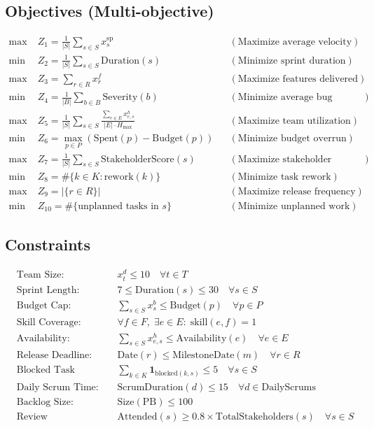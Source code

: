 \documentclass{article}
\begin{document}
\subsection*{Objectives (Multi-objective)}
\begin{align*}
\max &\; Z_{1} = \frac{1}{|S|}\sum_{s \in S} x_{s}^{\text{sp}}
&&(\text{Maximize average velocity})\\
\min &\; Z_{2} = \frac{1}{|S|}\sum_{s \in S} \text{Duration}(s)
&&(\text{Minimize sprint duration})\\
\max &\; Z_{3} = \sum_{r \in R} x_{r}^{f}
&&(\text{Maximize features delivered})\\
\min &\; Z_{4} = \frac{1}{|B|}\sum_{b\in B} \text{Severity}(b)
&&(\text{Minimize average bug severity})\\
\max &\; Z_{5} = \frac{1}{|S|}\sum_{s \in S} \frac{\sum_{e\in E} x_{e,s}^{h}}{|E|\cdot H_{\max}}
&&(\text{Maximize team utilization})\\
\min &\; Z_{6} = \max_{p\in P} \left(\text{Spent}(p) - \text{Budget}(p)\right)
&&(\text{Minimize budget overrun})\\
\max &\; Z_{7} = \frac{1}{|S|}\sum_{s \in S} \text{StakeholderScore}(s)
&&(\text{Maximize stakeholder satisfaction})\\
\min &\; Z_{8} = \#\{k\in K : \text{rework}(k)\}
&&(\text{Minimize task rework})\\
\max &\; Z_{9} = |\{r\in R\}|
&&(\text{Maximize release frequency})\\
\min &\; Z_{10} = \#\{\text{unplanned tasks in } s\}
&&(\text{Minimize unplanned work})
\end{align*}

\subsection*{Constraints}
\begin{align}
&\text{Team Size: } && x_{t}^{d} \le 10 \quad \forall t\in T \\
&\text{Sprint Length: } && 7 \le \text{Duration}(s) \le 30 \quad \forall s\in S \\
&\text{Budget Cap: } && \sum_{s\in S} x_{s}^{b} \le \text{Budget}(p)\quad \forall p\in P\\
&\text{Skill Coverage: } && \forall f\in F,\; \exists e\in E:\; \text{skill}(e,f)=1 \\
&\text{Availability: } && \sum_{s\in S} x_{e,s}^{h} \le \text{Availability}(e)\quad \forall e\in E\\
&\text{Release Deadline: } && \text{Date}(r) \le \text{MilestoneDate}(m)\quad \forall r\in R\\
&\text{Blocked Task Limit: } && \sum_{k\in K} \mathbf{1}_{\text{blocked}(k,s)} \le 5\quad \forall s\in S\\
&\text{Daily Scrum Time: } && \text{ScrumDuration}(d) \le 15 \quad \forall d\in \text{DailyScrums}\\
&\text{Backlog Size: } && \text{Size}(\mathrm{PB}) \le 100 \\
&\text{Review Attendance: } && \text{Attended}(s) \ge 0.8\times \text{TotalStakeholders}(s)\quad \forall s\in S
\end{align}
\end{document}
